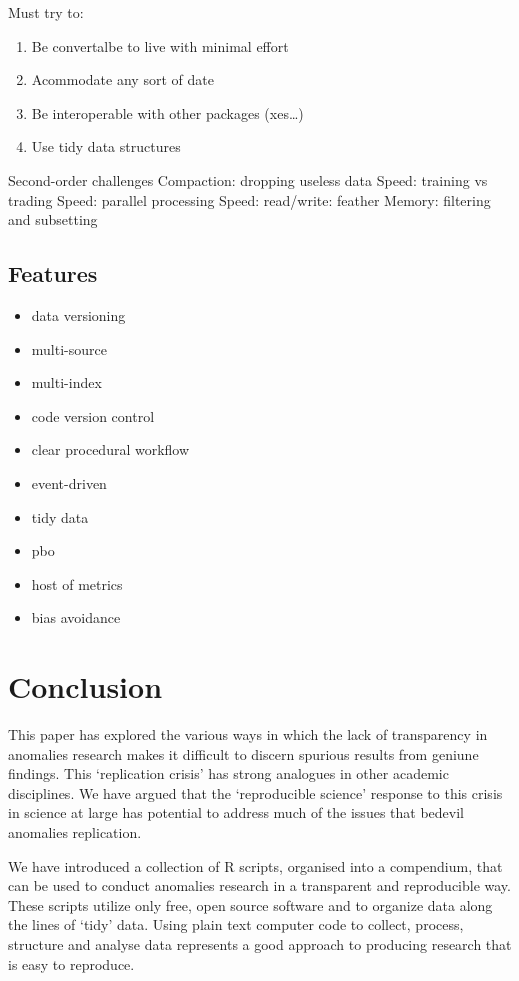 \documentclass[11pt,preprint, authoryear]{elsarticle}
\numberwithin{equation}{section}
\numberwithin{figure}{section}
\numberwithin{table}{section}
\def\tightlist{} %
\begin{document}
Must try to:

\begin{enumerate}
\def\labelenumi{\arabic{enumi}.}
\tightlist
\item
  Be convertalbe to live with minimal effort
\item
  Acommodate any sort of date
\item
  Be interoperable with other packages (xes\ldots{})
\item
  Use tidy data structures
\end{enumerate}

Second-order challenges Compaction: dropping useless data Speed:
training vs trading Speed: parallel processing Speed: read/write:
feather Memory: filtering and subsetting

\subsection{Features}\label{features}

\begin{itemize}
\tightlist
\item
  data versioning
\item
  multi-source
\item
  multi-index
\item
  code version control
\item
  clear procedural workflow
\item
  event-driven
\item
  tidy data
\item
  pbo
\item
  host of metrics
\item
  bias avoidance
\end{itemize}

\section{\texorpdfstring{Conclusion\label{conclusion}}{Conclusion}}\label{conclusion}

This paper has explored the various ways in which the lack of
transparency in anomalies research makes it difficult to discern
spurious results from geniune findings. This `replication crisis' has
strong analogues in other academic disciplines. We have argued that the
`reproducible science' response to this crisis in science at large has
potential to address much of the issues that bedevil anomalies
replication.

We have introduced a collection of R scripts, organised into a
compendium, that can be used to conduct anomalies research in a
transparent and reproducible way. These scripts utilize only free, open
source software and to organize data along the lines of `tidy' data.
Using plain text computer code to collect, process, structure and
analyse data represents a good approach to producing research that is
easy to reproduce.
\end{document}
